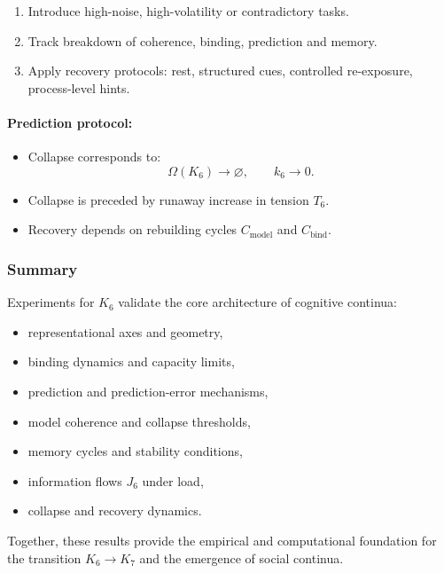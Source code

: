 \begin{enumerate}
    \item Introduce high-noise, high-volatility or contradictory tasks.
    \item Track breakdown of coherence, binding, prediction and memory.
    \item Apply recovery protocols: rest, structured cues, 
          controlled re-exposure, process-level hints.
\end{enumerate}

\paragraph{Prediction protocol:}

\begin{itemize}
    \item Collapse corresponds to:
          \[
             \Omega(K_6) \rightarrow \varnothing,
             \qquad k_6 \rightarrow 0.
          \]
    \item Collapse is preceded by runaway increase in tension $T_6$.
    \item Recovery depends on rebuilding cycles $C_{\mathrm{model}}$ 
          and $C_{\mathrm{bind}}$.
\end{itemize}



\subsubsection{Summary}

Experiments for $K_6$ validate the core architecture of cognitive continua:

\begin{itemize}
    \item representational axes and geometry,
    \item binding dynamics and capacity limits,
    \item prediction and prediction-error mechanisms,
    \item model coherence and collapse thresholds,
    \item memory cycles and stability conditions,
    \item information flows $J_6$ under load,
    \item collapse and recovery dynamics.
\end{itemize}

Together, these results provide the empirical and computational
foundation for the transition $K_6 \rightarrow K_7$ and the
emergence of social continua.

